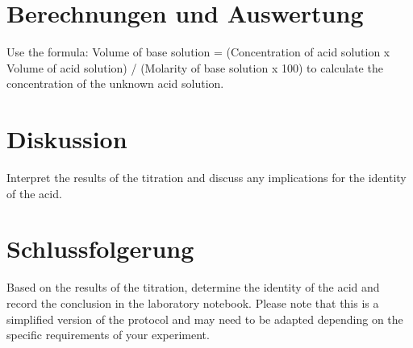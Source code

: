 \documentclass{article}%
\begin{document}
%
\section{Berechnungen und Auswertung}%
\label{sec:BerechnungenundAuswertung}%
Use the formula:
Volume of base solution = (Concentration of acid solution x Volume of acid solution) / (Molarity of base solution x 100)
to calculate the concentration of the unknown acid solution.

%
\section{Diskussion}%
\label{sec:Diskussion}%
Interpret the results of the titration and discuss any implications for the identity of the acid.

%
\section{Schlussfolgerung}%
\label{sec:Schlussfolgerung}%
Based on the results of the titration, determine the identity of the acid and record the conclusion in the laboratory notebook.
Please note that this is a simplified version of the protocol and may need to be adapted depending on the specific requirements of your experiment.

%
\end{document}
